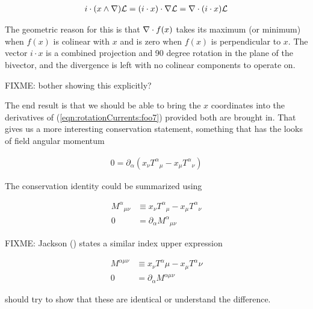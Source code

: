 \begin{align}\label{eqn:rotationCurrents:foo8}
i \cdot (x \wedge \nabla) \mathcal{L} = (i \cdot x) \cdot \nabla \mathcal{L} = \nabla \cdot (i \cdot x) \mathcal{L}
\end{align}

The geometric reason for this is that $\nabla \cdot f(x)$ takes its maximum (or minimum) when $f(x)$ is colinear with $x$ and is zero when $f(x)$ is perpendicular to $x$.  The vector $i \cdot x$ is a combined projection and 90 degree rotation in the plane of the bivector, and the divergence is left with no colinear components to operate on.

FIXME: bother showing this explicitly?

The end result is that we should be able to bring the $x$ coordinates into the derivatives of (\ref{eqn:rotationCurrents:foo7}) provided both are brought in.   That gives us a more interesting conservation statement, something that has the looks of field angular momentum

\begin{align}\label{eqn:rotationCurrents:foo9}
0 = \partial_\alpha \left( x_\nu {T^\alpha}_\mu - x_\mu {T^\alpha}_\nu \right)
\end{align}

The conservation identity could be summarized using 

\begin{align}\label{eqn:rotationCurrents:foo1}
{M^{\alpha}}_{\mu\nu} &\equiv x_\nu {T^\alpha}_\mu - x_\mu {T^\alpha}_\nu \\
0 &= \partial_\alpha {M^{\alpha}}_{\mu\nu} 
\end{align}

FIXME: Jackson (\cite{jackson1975cew}) states a similar index upper expression

\begin{align}\label{eqn:rotationCurrents:foo1}
M^{\alpha\mu\nu} &\equiv x_\nu {T^\alpha\mu} - x_\mu {T^\alpha\nu} \\
0 &= \partial_\alpha M^{\alpha\mu\nu}
\end{align}

should try to show that these are identical or understand the difference.

\EndArticle
